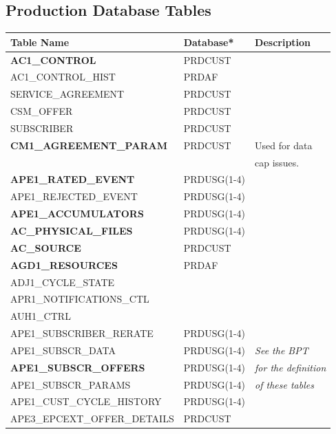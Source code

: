 \documentclass[12pt,twoside]{article}
\begin{document}
\subsection{Production Database Tables}
\label{sec-8-3}

\scriptsize

\begin{center}
\begin{tabular}{lll}
\hline
 \textbf{Table Name}             &  Database*    &  Description                \\
\hline
 \textbf{AC1\_CONTROL}           &  PRDCUST      &                             \\
 AC1\_CONTROL\_HIST              &  PRDAF        &                             \\
 SERVICE\_AGREEMENT              &  PRDCUST      &                             \\
 CSM\_OFFER                      &  PRDCUST      &                             \\
 SUBSCRIBER                      &  PRDCUST      &                             \\
 \textbf{CM1\_AGREEMENT\_PARAM}  &  PRDCUST      &  Used for data              \\
                                 &               &  cap issues.                \\
 \textbf{APE1\_RATED\_EVENT}     &  PRDUSG(1-4)  &                             \\
 APE1\_REJECTED\_EVENT           &  PRDUSG(1-4)  &                             \\
 \textbf{APE1\_ACCUMULATORS}     &  PRDUSG(1-4)  &                             \\
 \textbf{AC\_PHYSICAL\_FILES}    &  PRDUSG(1-4)  &                             \\
 \textbf{AC\_SOURCE}             &  PRDCUST      &                             \\
 \textbf{AGD1\_RESOURCES}        &  PRDAF        &                             \\
 ADJ1\_CYCLE\_STATE              &               &                             \\
 APR1\_NOTIFICATIONS\_CTL        &               &                             \\
 AUH1\_CTRL                      &               &                             \\
 APE1\_SUBSCRIBER\_RERATE        &  PRDUSG(1-4)  &                             \\
 APE1\_SUBSCR\_DATA              &  PRDUSG(1-4)  &  \emph{See the BPT}         \\
 \textbf{APE1\_SUBSCR\_OFFERS}   &  PRDUSG(1-4)  &  \emph{for the definition}  \\
 APE1\_SUBSCR\_PARAMS            &  PRDUSG(1-4)  &  \emph{of these tables}     \\
 APE1\_CUST\_CYCLE\_HISTORY      &  PRDUSG(1-4)  &                             \\
 APE3\_EPCEXT\_OFFER\_DETAILS    &  PRDCUST      &                             \\
\hline
\end{tabular}
\end{center}
\end{document}
